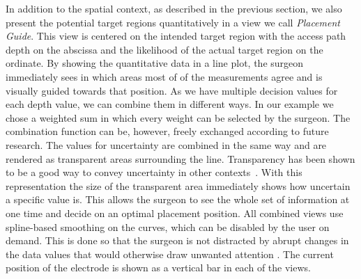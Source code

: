 \documentclass[review]{vgtc}                 %
\begin{document}
In addition to the spatial context, as described in the previous section, we also present the potential target regions quantitatively in a view we call \emph{Placement Guide}. This view is centered on the intended target region with the access path depth on the abscissa and the likelihood of the actual target region on the ordinate. By showing the quantitative data in a line plot, the surgeon immediately sees in which areas most of of the measurements agree and is visually guided towards that position. As we have multiple decision values for each depth value, we can combine them in different ways. In our example we chose a weighted sum in which every weight can be selected by the surgeon. The combination function can be, however, freely exchanged according to future research. The values for uncertainty are combined in the same way and are rendered as transparent areas surrounding the line. Transparency has been shown to be a good way to convey uncertainty in other contexts~\cite{Djurcilov2002239}. With this representation the size of the transparent area immediately shows how uncertain a specific value is. This allows the surgeon to see the whole set of information at one time and decide on an optimal placement position. All combined views use spline-based smoothing on the curves, which can be disabled by the user on demand. This is done so that the surgeon is not distracted by abrupt changes in the data values that would otherwise draw unwanted attention . The current position of the electrode is shown as a vertical bar in each of the views.
\end{document}
